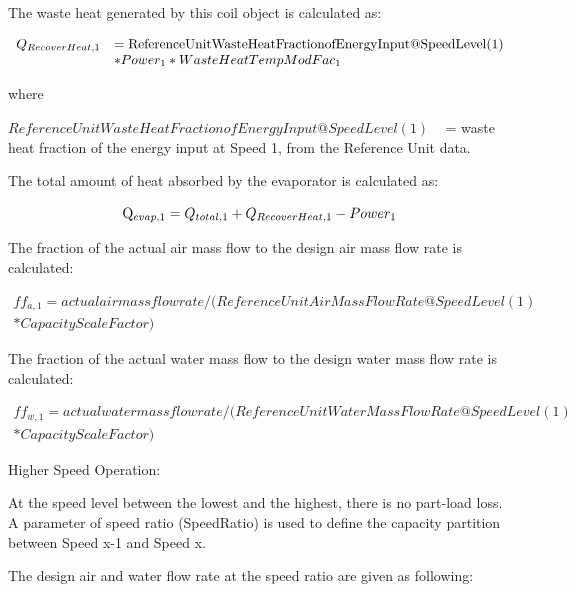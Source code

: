 The waste heat generated by this coil object is calculated as:

\begin{equation}
  \begin{array}{rl}
    Q_{RecoverHeat,1} &= \rm{ReferenceUnitWasteHeatFractionofEnergyInput@SpeedLevel(1)} \\
                      &* Power_1 * WasteHeatTempModFac_1
  \end{array}
\end{equation}

where

\(ReferenceUnitWasteHeatFractionofEnergyInput@SpeedLevel\left( 1 \right)\) ~ = waste heat fraction of the energy input at Speed 1, from the Reference Unit data.

The total amount of heat absorbed by the evaporator is calculated as:

\begin{equation}
{\rm{Q}}{{\rm{}}_{evap,1}} = {Q_{total,1}} + {\rm{}}{Q_{RecoverHeat,1}} - Powe{r_1}
\end{equation}

The fraction of the actual air mass flow to the design air mass flow rate is calculated:

\begin{equation}
\begin{split}
  ff_{a,1} = actualairmassflowrate/(ReferenceUnitAirMassFlowRate@SpeedLevel(1) \\
  *CapacityScaleFactor)
\end{split}
\end{equation}

The fraction of the actual water mass flow to the design water mass flow rate is calculated:

\begin{equation}
\begin{split}
  ff_{w,1} = actualwatermassflowrate/(ReferenceUnitWaterMassFlowRate@SpeedLevel(1) \\
  *CapacityScaleFactor)
\end{split}
\end{equation}

Higher Speed Operation:

At the speed level between the lowest and the highest, there is no part-load loss. A parameter of speed ratio (SpeedRatio) is used to define the capacity partition between Speed x-1 and Speed x.

The design air and water flow rate at the speed ratio are given as following:

